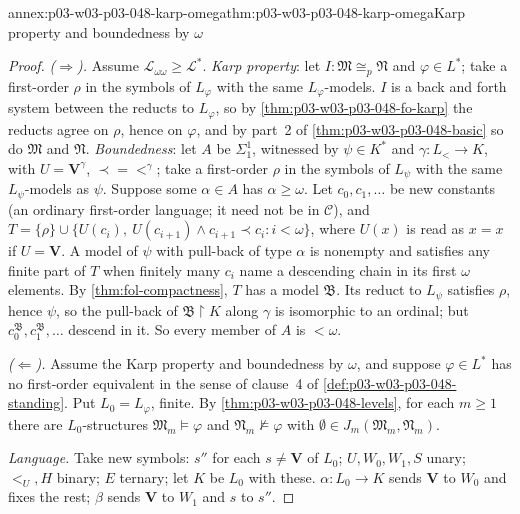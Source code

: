 \begin{annexitem}{annex:p03-w03-p03-048-karp-omega}{thm:p03-w03-p03-048-karp-omega}{Karp property and boundedness by \(\omega\)}
\begin{proof}
\emph{(\(\Rightarrow\)).}  Assume \(\mathcal L_{\omega\omega}\geq
\mathcal L^{\ast}\).  \emph{Karp property}: let
\(I:\mathfrak M\cong_{p}\mathfrak N\) and \(\varphi\in L^{\ast}\); take a
first-order \(\rho\) in the symbols of \(L_\varphi\) with the same
\(L_\varphi\)-models.  \(I\) is a back and forth system between the reducts
to \(L_\varphi\), so by \cref{thm:p03-w03-p03-048-fo-karp} the reducts agree
on \(\rho\), hence on \(\varphi\), and by part~2 of
\cref{thm:p03-w03-p03-048-basic} so do \(\mathfrak M\) and \(\mathfrak N\).
\emph{Boundedness}: let \(A\) be \(\Sigma^1_1\), witnessed by \(\psi\in
K^{\ast}\) and \(\gamma:L_{<}\to K\), with \(U=\mathbf V^{\gamma}\),
\(\prec=<^{\gamma}\); take a first-order \(\rho\) in the symbols of
\(L_\psi\) with the same \(L_\psi\)-models as \(\psi\).  Suppose some
\(\alpha\in A\) has \(\alpha\geq\omega\).  Let \(c_0,c_1,\ldots\) be new
constants (an ordinary first-order language; it need not be in
\(\mathcal C\)), and \(T=\{\rho\}\cup\{U(c_i),\ U(c_{i+1})\land
c_{i+1}\prec c_i:i<\omega\}\), where \(U(x)\) is read as \(x=x\) if
\(U=\mathbf V\).  A model of \(\psi\) with pull-back of type \(\alpha\) is
nonempty and satisfies any finite part of \(T\) when finitely many \(c_i\)
name a descending chain in its first \(\omega\) elements.  By
\cref{thm:fol-compactness}, \(T\) has a model \(\mathfrak B\).  Its reduct to
\(L_\psi\) satisfies \(\rho\), hence \(\psi\), so the pull-back of
\(\mathfrak B\restriction K\) along \(\gamma\) is isomorphic to an ordinal;
but \(c_0^{\mathfrak B},c_1^{\mathfrak B},\ldots\) descend in it.  So every
member of \(A\) is \(<\omega\).

\emph{(\(\Leftarrow\)).}  Assume the Karp property and boundedness by
\(\omega\), and suppose \(\varphi\in L^{\ast}\) has no first-order
equivalent in the sense of clause~4 of \cref{def:p03-w03-p03-048-standing}.
Put \(L_0=L_\varphi\), finite.  By \cref{thm:p03-w03-p03-048-levels}, for
each \(m\geq1\) there are \(L_0\)-structures \(\mathfrak M_m\models\varphi\)
and \(\mathfrak N_m\not\models\varphi\) with \(\emptyset\in
J_m(\mathfrak M_m,\mathfrak N_m)\).

\emph{Language.}  Take new symbols: \(s''\) for each \(s\neq\mathbf V\) of
\(L_0\); \(U,W_0,W_1,S\) unary; \(<_U,H\) binary; \(E\) ternary; let \(K\)
be \(L_0\) with these.  \(\alpha:L_0\to K\) sends \(\mathbf V\) to \(W_0\)
and fixes the rest; \(\beta\) sends \(\mathbf V\) to \(W_1\) and \(s\) to
\(s''\).


\end{proof}
\end{annexitem}
